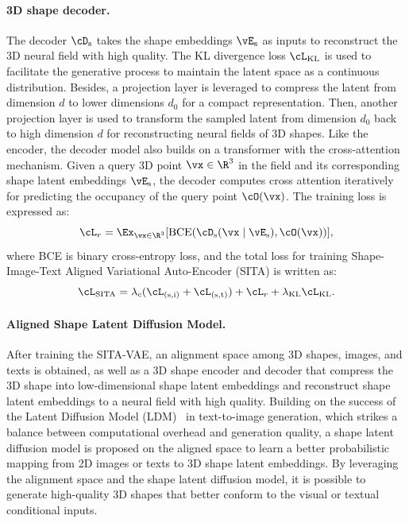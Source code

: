 \documentclass[../../book-main.tex]{subfiles}
\begin{document}
\paragraph{3D shape decoder.} The decoder \(\cD_{\mathrm{s}}\) takes the
shape embeddings \(\vE_{\mathrm{s}}\) as inputs to reconstruct the 3D
neural field with high quality.
The KL divergence loss
\(\cL_{\mathrm{KL}}\) is used to facilitate the generative process to
maintain the latent space as a continuous distribution.
Besides, a projection layer is leveraged to compress the latent from
dimension \(d\) to lower dimensions \(d_0\) for a compact representation.
Then, another projection layer is used to transform the sampled
latent from dimension \(d_0\) back to high dimension \(d\) for
reconstructing neural fields of 3D shapes.
Like the encoder, the decoder model also builds on a transformer with the
cross-attention mechanism.
Given a query 3D point \(\vx \in \R^{3}\) in the field
and its corresponding shape latent embeddings \(\vE_{\mathrm{s}}\), the decoder
computes cross attention iteratively for predicting the occupancy of the query
point \(\cO (\vx)\).
The training loss is expressed as:
\begin{equation}
\cL_r = \Ex_{\vx \in \R^3} [\mathrm{BCE}(\cD_{\mathrm{s}}(\vx \mid \vE_{\mathrm{s}}), \cO(\vx))] ,
\end{equation}
where BCE is binary cross-entropy loss, and the total loss for
training Shape-Image-Text Aligned Variational Auto-Encoder (SITA) is written as:
\begin{equation}
\cL_{\mathrm{SITA}} = \lambda_c (\cL_{(\mathrm{s},\mathrm{i})}
+ \cL_{(\mathrm{s},\mathrm{t})}) + \cL_r +
\lambda_{\mathrm{KL}} \cL_{\mathrm{KL}} .
\label{eq:sita_vae}
\end{equation}

\paragraph{Aligned Shape Latent Diffusion Model.}
After training the SITA-VAE, an alignment space among 3D shapes,
images, and texts is obtained, as well as a 3D shape encoder and
decoder that compress the 3D shape into low-dimensional shape latent
embeddings and reconstruct shape latent embeddings to a neural field
with high quality.
Building on the success of the Latent Diffusion
Model (LDM)~\citep{rombach2022high} in text-to-image generation, which
strikes a balance between computational overhead and generation
quality, a shape latent diffusion model is proposed on the aligned
space to learn a better probabilistic mapping from 2D images or texts
to 3D shape latent embeddings.
By leveraging the alignment space and
the shape latent diffusion model, it is possible to generate
high-quality 3D shapes that better conform to the visual or textual
conditional inputs.
\end{document}
